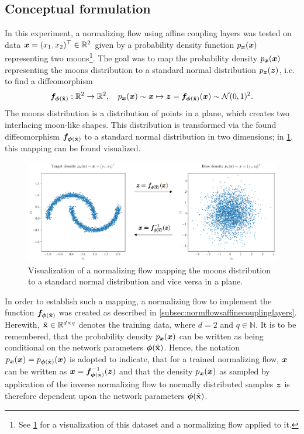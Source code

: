 \documentclass[a4paper,12pt]{report}
\begin{document}
\subsection{Conceptual formulation}
In this experiment, a normalizing flow using affine coupling layers was tested on data $\bm{x}=(x_1,x_2)^\top \in \mathbb{R}^2$ given by a probability density function $p_{\bm{x}}(\bm{x})$ representing two moons\footnote{See \cref{fig:target-to-base} for a visualization of this dataset and a normalizing flow applied to it.}. The goal was to map the probability density $p_{\bm{x}}(\bm{x})$ representing the moons distribution to a standard normal distribution $p_{\bm{z}}(\bm{z})$, i.e. to find a diffeomorphism
\begin{equation}
\bm{f}_{\bm{\phi}(\hat{\boldsymbol{\mathbf{x}}})}: \mathbb{R}^2\rightarrow \mathbb{R}^2, \quad p_{\bm{x}}(\bm{x}) \sim \bm{x} \mapsto \bm{z} = \bm{f}_{\bm{\phi}(\hat{\boldsymbol{\mathbf{x}}})}(\bm{x}) \sim \mathcal{N}(0,1)^2.
\end{equation}
The moons distribution is a distribution of points in a plane, which creates two interlacing moon-like shapes. This distribution is transformed via the found diffeomorphism $\bm{f}_{\bm{\phi}(\hat{\boldsymbol{\mathbf{x}}})}$ to a standard normal distribution in two dimensions; in \cref{fig:target-to-base}, this mapping can be found visualized.
\begin{figure}
\centering
\includegraphics[width=\textwidth-2cm]{figures/target-to-base.pdf}
\caption{Visualization of a normalizing flow mapping the moons distribution to a standard normal distribution and vice versa in a plane.}
\label{fig:target-to-base}
\end{figure}

In order to establish such a mapping, a normalizing flow to implement the function $\bm{f}_{\bm{\phi}(\hat{\boldsymbol{\mathbf{x}}})}$ was created as described in \cref{subsec:normflowsaffinecouplinglayers}. Herewith, $\hat{\boldsymbol{\mathbf{x}}} \in \mathbb{R}^{d\times q}$ denotes the training data, where $d=2$ and $q \in \mathbb{N}$. It is to be remembered, that the probability density $p_{\bm{x}}(\bm{x})$ can be written as being conditional on the network parameters $\bm{\phi}(\hat{\boldsymbol{\mathbf{x}}})$. Hence, the notation $p_{\bm{x}}(\bm{x}) = p_{\bm{\phi}(\hat{\boldsymbol{\mathbf{x}}})}(\bm{x})$ is adopted to indicate, that for a trained normalizing flow, $\bm{x}$ can be written as $\bm{x} = \bm{f}^{-1}_{\bm{\phi}(\hat{\boldsymbol{\mathbf{x}}})}(\bm{z})$ and that the density $p_{\bm{x}}(\bm{x})$ as sampled by application of the inverse normalizing flow to normally distributed samples $\bm{z}$ is therefore dependent upon the network parameters $\bm{\phi}(\hat{\boldsymbol{\mathbf{x}}})$.
\end{document}

